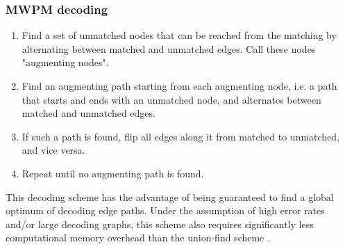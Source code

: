 \subsubsection{MWPM decoding}
\begin{enumerate}
    \item Find a set of unmatched nodes that can be reached from the 
    matching by alternating between matched and unmatched edges. 
    Call these nodes "augmenting nodes".
    \item Find an augmenting path starting from each augmenting node,
    i.e. a path that starts and ends with an unmatched node, and
    alternates between matched and unmatched edges. 
    \item If such a path is found, flip all edges along it from matched
    to unmatched, and vice versa.
    \item Repeat until no augmenting path is found.
\end{enumerate}
This decoding scheme has the advantage of being guaranteed
to find a global optimum of decoding edge paths.
Under the assumption of high error rates and/or large decoding 
graphs, this scheme also requires significantly less
computational memory overhead than the union-find scheme
\cite{MWPMDecoder}.